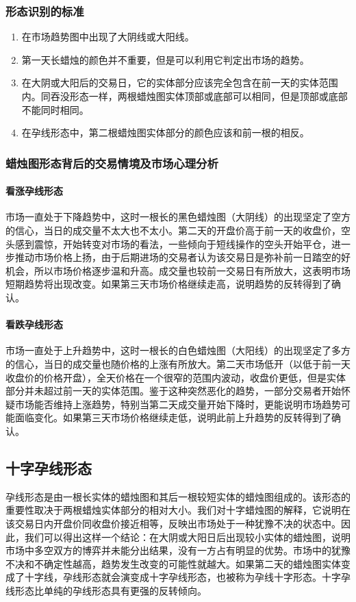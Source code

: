 \subsubsection*{形态识别的标准}
\begin{enumerate}
    \item 在市场趋势图中出现了大阴线或大阳线。
    \item 第一天长蜡烛的颜色并不重要，但是可以利用它判定出市场的趋势。
    \item 在大阴或大阳后的交易日，它的实体部分应该完全包含在前一天的实体范围内。同吞没形态一样，两根蜡烛图实体顶部或底部可以相同，但是顶部或底部不能同时相同。
    \item 在孕线形态中，第二根蜡烛图实体部分的颜色应该和前一根的相反。
\end{enumerate}
\subsubsection*{蜡烛图形态背后的交易情境及市场心理分析}
\paragraph{看涨孕线形态}
市场一直处于下降趋势中，这时一根长的黑色蜡烛图（大阴线）的出现坚定了空方的信心，当日的成交量不太大也不太小。第二天的开盘价高于前一天的收盘价，空头感到震惊，开始转变对市场的看法，一些倾向于短线操作的空头开始平仓，进一步推动市场价格上扬，由于后期进场的交易者认为该交易日是弥补前一日踏空的好机会，所以市场价格逐步温和升高。成交量也较前一交易日有所放大，这表明市场短期趋势将出现改变。如果第三天市场价格继续走高，说明趋势的反转得到了确认。
\paragraph{看跌孕线形态}
市场一直处于上升趋势中，这时一根长的白色蜡烛图（大阳线）的出现坚定了多方的信心，当日的成交量也随价格的上涨有所放大。第二天市场低开（以低于前一天收盘价的价格开盘），全天价格在一个很窄的范围内波动，收盘价更低，但是实体部分并未超过前一天的实体范围。鉴于这种突然恶化的趋势，一部分交易者开始怀疑市场能否维持上涨趋势，特别当第二天成交量开始下降时，更能说明市场趋势可能面临变化。如果第三天市场价格继续走低，说明此前上升趋势的反转得到了确认。
\subsection{十字孕线形态}
孕线形态是由一根长实体的蜡烛图和其后一根较短实体的蜡烛图组成的。该形态的重要性取决于两根蜡烛实体部分的相对大小。我们对十字蜡烛图的解释，它说明在该交易日内开盘价同收盘价接近相等，反映出市场处于一种犹豫不决的状态中。因此，我们可以得出这样一个结论：在大阴或大阳日后出现较小实体的蜡烛图，说明市场中多空双方的博弈并未能分出结果，没有一方占有明显的优势。市场中的犹豫不决和不确定性越高，趋势发生改变的可能性就越大。如果第二天的蜡烛图实体变成了十字线，孕线形态就会演变成十字孕线形态，也被称为孕线十字形态。十字孕线形态比单纯的孕线形态具有更强的反转倾向。
